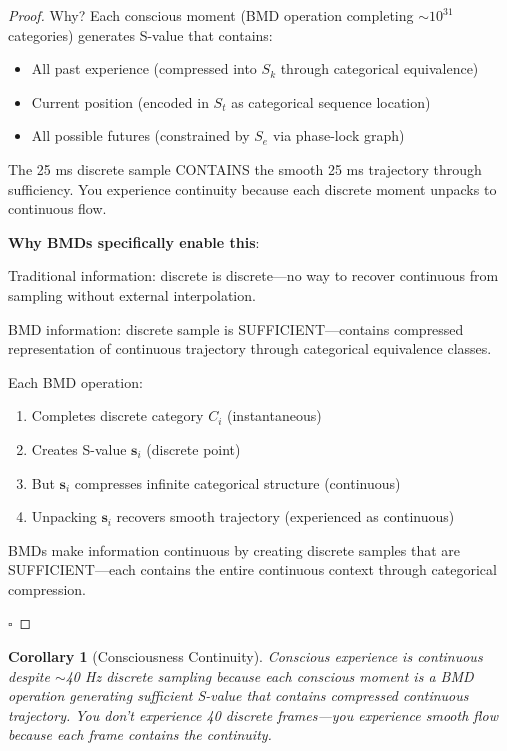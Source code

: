\documentclass[12pt,a4paper]{article}
\newtheorem{corollary}[theorem]{Corollary}
\begin{document}
\begin{proof}
Why? Each conscious moment (BMD operation completing $\sim 10^{31}$ categories) generates S-value that contains:
\begin{itemize}
\item All past experience (compressed into $S_k$ through categorical equivalence)
\item Current position (encoded in $S_t$ as categorical sequence location)
\item All possible futures (constrained by $S_e$ via phase-lock graph)
\end{itemize}

The 25 ms discrete sample CONTAINS the smooth 25 ms trajectory through sufficiency. You experience continuity because each discrete moment unpacks to continuous flow.

\textbf{Why BMDs specifically enable this}:

Traditional information: discrete is discrete—no way to recover continuous from sampling without external interpolation.

BMD information: discrete sample is SUFFICIENT—contains compressed representation of continuous trajectory through categorical equivalence classes.

Each BMD operation:
\begin{enumerate}
\item Completes discrete category $C_i$ (instantaneous)
\item Creates S-value $\mathbf{s}_i$ (discrete point)
\item But $\mathbf{s}_i$ compresses infinite categorical structure (continuous)
\item Unpacking $\mathbf{s}_i$ recovers smooth trajectory (experienced as continuous)
\end{enumerate}

BMDs make information continuous by creating discrete samples that are SUFFICIENT—each contains the entire continuous context through categorical compression.

$\square$
\end{proof}

\begin{corollary}[Consciousness Continuity]
\label{cor:consciousness_continuity}
Conscious experience is continuous despite $\sim$40 Hz discrete sampling because each conscious moment is a BMD operation generating sufficient S-value that contains compressed continuous trajectory. You don't experience 40 discrete frames—you experience smooth flow because each frame contains the continuity.
\end{corollary}
\end{document}
